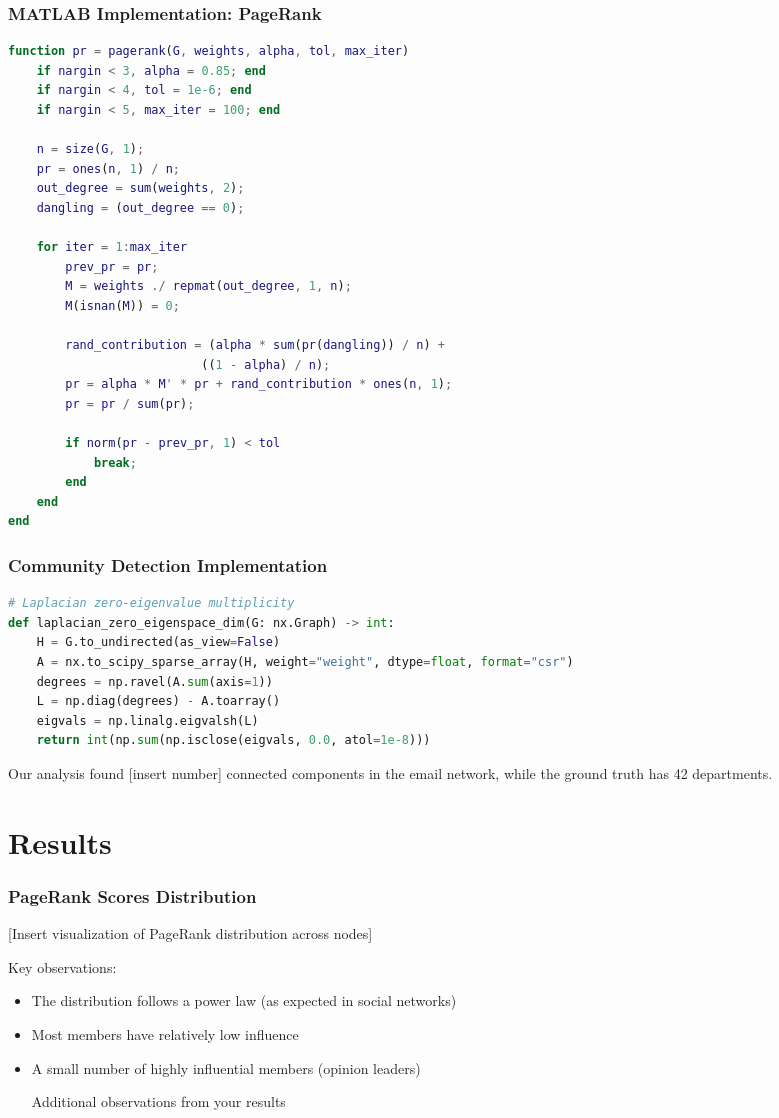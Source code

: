 \documentclass{beamer}
\begin{document}
\begin{frame}[fragile]
    \frametitle{MATLAB Implementation: PageRank}
    \begin{lstlisting}[language=Matlab, basicstyle=\tiny]
% PageRank implementation
function pr = pagerank(G, weights, alpha, tol, max_iter)
    if nargin < 3, alpha = 0.85; end
    if nargin < 4, tol = 1e-6; end
    if nargin < 5, max_iter = 100; end
    
    n = size(G, 1);
    pr = ones(n, 1) / n;
    out_degree = sum(weights, 2);
    dangling = (out_degree == 0);
    
    for iter = 1:max_iter
        prev_pr = pr;
        M = weights ./ repmat(out_degree, 1, n);
        M(isnan(M)) = 0;
        
        rand_contribution = (alpha * sum(pr(dangling)) / n) + 
                           ((1 - alpha) / n);
        pr = alpha * M' * pr + rand_contribution * ones(n, 1);
        pr = pr / sum(pr);
        
        if norm(pr - prev_pr, 1) < tol
            break;
        end
    end
end
    \end{lstlisting}
\end{frame}

\begin{frame}[fragile]
    \frametitle{Community Detection Implementation}
    \begin{lstlisting}[language=Python, basicstyle=\tiny]
# Laplacian zero-eigenvalue multiplicity
def laplacian_zero_eigenspace_dim(G: nx.Graph) -> int:
    H = G.to_undirected(as_view=False)
    A = nx.to_scipy_sparse_array(H, weight="weight", dtype=float, format="csr")
    degrees = np.ravel(A.sum(axis=1))
    L = np.diag(degrees) - A.toarray()
    eigvals = np.linalg.eigvalsh(L)
    return int(np.sum(np.isclose(eigvals, 0.0, atol=1e-8)))
    \end{lstlisting}
    
    Our analysis found [insert number] connected components in the email network, while the ground truth has 42 departments.
\end{frame}

\section{Results}

\begin{frame}
    \frametitle{PageRank Scores Distribution}
    [Insert visualization of PageRank distribution across nodes]
    
    Key observations:
    \begin{itemize}
        \item The distribution follows a power law (as expected in social networks)
        \item Most members have relatively low influence
        \item A small number of highly influential members (opinion leaders)
        \item [Additional observations from your results]
    \end{itemize}
\end{frame}
\end{document}

